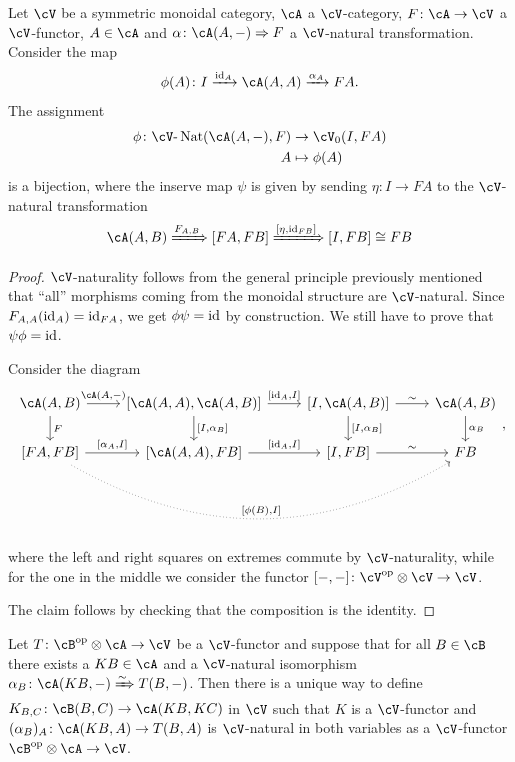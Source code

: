 \documentclass[a4paper,11pt,oneside,openany]{scrbook}
\begin{document}
\begin{thm}
	Let $\cV$ be a symmetric monoidal category, $\cA$ a $\cV$-category, $F\colon\cA\rightarrow\cV$ a $\cV$-functor, $A\in\cA$ and $\alpha\colon\cA(A,-)\Rightarrow F$ a $\cV$-natural transformation. Consider the map$$\phi(A)\colon I\xrightarrow{\id_A}\cA(A,A)\xrightarrow{\alpha_A}FA.$$
	The assignment
	\begin{align*}
		\phi\colon\cV\text{-}\Nat(\cA(A,-),F) & \rightarrow\cV_0(I,FA) \\
		A                                     & \mapsto\phi(A)
	\end{align*}
	is a bijection, where the inserve map $\psi$ is given by sending $\eta\colon I\rightarrow FA$ to the $\cV$-natural transformation
	$$\cA(A,B)\xRightarrow{F_{A,B}}[FA,FB]\xRightarrow{[\eta,\id_{FB}]}[I,FB]\cong FB$$
\end{thm}

\begin{proof}
	$\cV$-naturality follows from the general principle previously mentioned that ``all'' morphisms coming from the monoidal structure are $\cV$-natural. Since $F_{A,A}(\operatorname{id}_A)=\operatorname{id}_{FA}$, we get $\phi\psi=\operatorname{id}$ by construction. We still have to prove that $\psi\phi=\operatorname{id}$.

	Consider the diagram
	\[
		\begin{tikzcd}
			\cA(A,B)\ar[r, "{\cA(A,-)}"]\ar[d, "F"]
			& {[\cA(A,A),\cA(A,B)]}\ar[r, "{[\id_A,I]}"]\ar[d, "{[I,\alpha_B]}"]
			& {[I,\cA(A,B)]}\ar[r, "\sim"]\ar[d, "{[I,\alpha_B]}"]
			& \cA(A,B)\ar[d, "\alpha_B"] \\
			{[FA,FB]}\ar[r, "{[\alpha_A,I]}"]\ar[rrr, bend right, dotted, "{[\phi(B),I]}"]
			& {[\cA(A,A),FB]}\ar[r, "{[\id_A,I]}"]
			& {[I,FB]}\ar[r, "\sim"]
			& FB
		\end{tikzcd}
		,\]
	where the left and right squares on extremes commute by $\cV$-naturality, while for the one in the middle we consider the functor $[-,-]\colon\cV^{\op}\otimes\cV\rightarrow\cV$.

	The claim follows by checking that the composition is the identity.
\end{proof}

\begin{thm}
	Let $T\colon\cB^{\op}\otimes\cA\rightarrow\cV$ be a $\cV$-functor and suppose that for all $B\in\cB$ there exists a $KB\in\cA$ and a $\cV$-natural isomorphism $\alpha_B\colon\cA(KB,-)\xRightarrow{\sim} T(B,-)$. Then there is a unique way to define $K_{B,C}\colon\cB(B,C)\rightarrow\cA(KB,KC)$ in $\cV$ such that $K$ is a $\cV$-functor and $(\alpha_B)_A\colon\cA(KB,A)\rightarrow T(B,A)$ is $\cV$-natural in both variables as a $\cV$-functor $\cB^{\op}\otimes\cA\rightarrow\cV$.
\end{thm}
\end{document}
